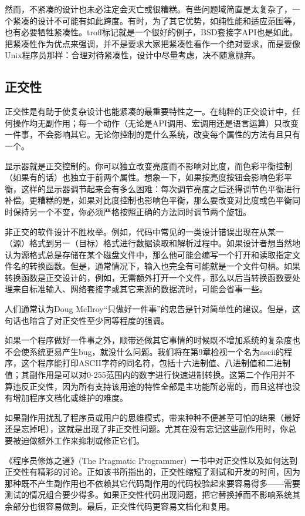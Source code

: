 \documentclass[12pt,oneside]{ctexbook}
\begin{document}
\begin{common-format}
然而，不紧凑的设计也未必注定会灭亡或很糟糕。有些问题域简直是太复杂了，一个紧凑的设计不可能有如此跨度。有时，为了其它优势，如纯性能和适应范围等，也有必要牺牲紧凑性。troff标记就是一个很好的例子，BSD套接字API也是如此。把紧凑性作为优点来强调，并不是要求大家把紧凑性看作一个绝对要求，而是要像Unix程序员那样：合理对待紧凑性，设计中尽量考虑，决不随意抛弃。

\subsection{正交性}
正交性是有助于使复杂设计也能紧凑的最重要特性之一。在纯粹的正交设计中，任何操作均无副作用；每一个动作（无论是API调用、宏调用还是语言运算）只改变一件事，不会影响其它。无论你控制的是什么系统，改变每个属性的方法有且只有一个。

显示器就是正交控制的。你可以独立改变亮度而不影响对比度，而色彩平衡控制（如果有的话）也独立于前两个属性。想象一下，如果按亮度按钮会影响色彩平衡，这样的显示器调节起来会有多么困难：每次调节亮度之后还得调节色平衡进行补偿。更糟糕的是，如果对比度控制也影响色平衡，那么要改变对比度或色平衡同时保持另一个不变，你必须严格按照正确的方法同时调节两个旋钮。

非正交的软件设计不胜枚举。例如，代码中常见的一类设计错误出现在从某一（源）格式到另一（目标）格式进行数据读取和解析过程中。如果设计者想当然地认为源格式总是存储在某个磁盘文件中，那么他可能会编写一个打开和读取指定文件名的转换函数。但是，通常情况下，输入也完全有可能就是一个文件句柄。如果转换函数是正交设计的，例如，无需额外打开一个文件，那么以后当转换函数要处理来自标准输入、网络套接字或其它来源的数据流时，可能会省事一些。

人们通常认为Doug McIlroy“只做好一件事”的忠告是针对简单性的建议。但是，这句话也暗含了对正交性至少同等程度的强调。

如果一个程序做好一件事之外，顺带还做其它事情的时候既不增加系统的复杂度也不会使系统更易产生bug，就没什么问题。我们将在第9章检视一个名为ascii的程序，这个程序能打印ASCII字符的同名符，包括十六进制值、八进制值和二进制值；其副作用是可以对0-255范围内的数字进行快速进制转换。这第二个作用并不算违反正交性，因为所有支持该用途的特性全部是主功能所必需的，而且这样也没有增加程序文档化或维护的难度。

如果副作用扰乱了程序员或用户的思维模式，带来种种不便甚至可怕的结果（最好还是忘掉吧），这就是出现了非正交性问题。尤其在没有忘记这些副作用时，你总要被迫做额外工作来抑制或修正它们。

《程序员修炼之道》(The Pragmatic Programmer)~\cite{Hunt-Thomas}一书中对正交性以及如何达到正交性有精彩的讨论。正如该书所指出的，正交性缩短了测试和开发的时间，因为那种既不产生副作用也不依赖其它代码副作用的代码校验起来要容易得多——需要测试的情况组合要少得多。如果正交性代码出现问题，把它替换掉而不影响系统其余部分也很容易做到。最后，正交性代码更容易文档化和复用。


\end{common-format}
\end{document}
